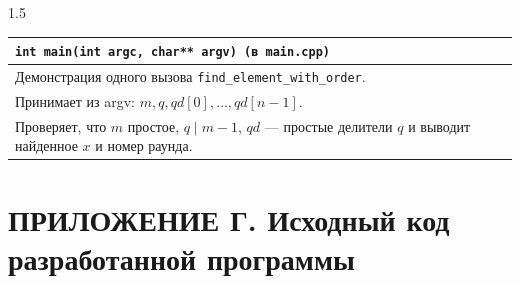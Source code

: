 \documentclass[14pt,a4paper]{extarticle}
\begin{document}
\begin{spacing}{1.5}
\vspace{0.2cm}
\noindent\begin{tabularx}{\textwidth}{|X|}
\hline
\texttt{int main(int argc, char** argv) (в main.cpp)} \\
\hline
Демонстрация одного вызова \texttt{find\_element\_with\_order}. \\
Принимает из argv: \(m, q, qd[0], \dots, qd[n-1]\). \\
Проверяет, что \(m\) простое, \(q \mid m-1\), \(qd\) — простые делители \(q\) и выводит найденное \(x\) и номер раунда. \\
\hline
\end{tabularx}

\end{spacing}

\newpage
\section*{ПРИЛОЖЕНИЕ Г. Исходный код разработанной программы}
\end{document}

